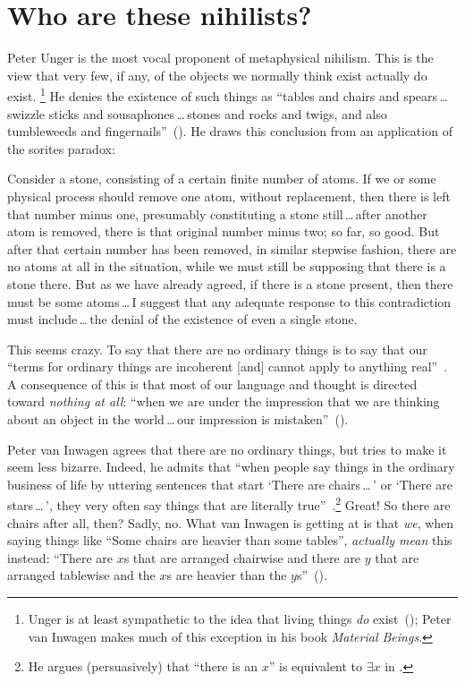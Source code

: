 \section{Who are these nihilists?}
Peter Unger is the most vocal proponent of metaphysical nihilism. This is the view that very few, if any, of the objects we normally think exist actually do exist.%
%
\footnote{Unger is at least sympathetic to the idea that living things {\em do} exist~(\citeyear[151]{unger1979}); Peter van Inwagen makes much of this exception in his book {\em Material Beings}.}%
He denies the existence of such things as ``tables and chairs and spears\,\ldots\,swizzle sticks and sousaphones\,\ldots\,stones and rocks and twigs, and also tumbleweeds and fingernails''~(\citeyear[117]{unger1979}). He draws this conclusion from an application of the sorites paradox:
\begin{squote}
Consider a stone, consisting of a certain finite number of atoms. If we or some physical process should remove one atom, without replacement, then there is left that number minus one, presumably constituting a stone still\,\ldots\,after another atom is removed, there is that original number minus two; so far, so good. But after that certain number has been removed, in similar stepwise fashion, there are no atoms at all in the situation, while we must still be supposing that there is a stone there. But as we have already agreed, if there is a stone present, then there must
be some atoms\,\ldots\,I suggest that any adequate response to this contradiction must include\,\ldots\,the denial of the existence of even a single stone.~\citep[121--122]{unger1979}
\end{squote}
This seems crazy. To say that there are no ordinary things is to say that our ``terms for ordinary things are incoherent [and] cannot apply to anything real''~\citep[147]{unger1979}. A consequence of this is that most of our language and thought is directed toward {\em nothing at all}: ``when we are under the impression that we are thinking about an object in the world\,\ldots\,our impression is mistaken''~(\citeyear[149]{unger1979}).

Peter van Inwagen agrees that there are no ordinary things, but tries to make it seem less bizarre. Indeed, he admits that ``when people say things in the ordinary business of life by uttering sentences that start `There are chairs\,\ldots\,' or `There are stars\,\ldots\,', they very often say things that are literally true''~\cite[102]{inwagen1995}.\footnote{He argues (persuasively) that ``there is an $x$'' is equivalent to $\exists x$ in \citet{inwagen1998}.} Great! So there are chairs after all, then? Sadly, no. What van Inwagen is getting at is that {\em we}, when saying things like ``Some chairs are heavier than some tables'', {\em actually mean} this instead: ``There are $x$s that are arranged chairwise and there are $y$ that are arranged tablewise and the $x$s are heavier than the $y$s''~(\citeyear[109]{inwagen1995}).

